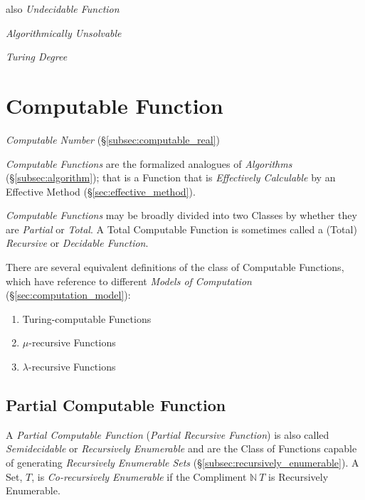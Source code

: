 \documentclass{article}
\begin{document}
also \emph{Undecidable Function}

\emph{Algorithmically Unsolvable}

\emph{Turing Degree}



\section{Computable Function}\label{sec:computable_function}

\emph{Computable Number} (\S\ref{subsec:computable_real})

\emph{Computable Functions} are the formalized analogues of
\emph{Algorithms} (\S\ref{subsec:algorithm}); that is a Function that
is \emph{Effectively Calculable} by an Effective Method
(\S\ref{sec:effective_method}).

\emph{Computable Functions} may be broadly divided into two Classes by
whether they are \emph{Partial} or \emph{Total}. A Total Computable
Function is sometimes called a (Total) \emph{Recursive} or
\emph{Decidable Function}.

There are several equivalent definitions of the class of Computable
Functions, which have reference to different \emph{Models of
  Computation} (\S\ref{sec:computation_model}):
\begin{enumerate}
\item Turing-computable Functions
\item $\mu$-recursive Functions
\item $\lambda$-recursive Functions
\end{enumerate}

\subsection{Partial Computable Function}\label{subsec:partial_recursive}

A \emph{Partial Computable Function} (\emph{Partial Recursive
  Function}) is also called \emph{Semidecidable} or \emph{Recursively
  Enumerable} and are the Class of Functions capable of generating
\emph{Recursively Enumerable Sets}
(\S\ref{subsec:recursively_enumerable}). A Set, $T$, is
\emph{Co-recursively Enumerable} if the Compliment $\mathbb{N} \ T$ is
Recursively Enumerable.
\end{document}
